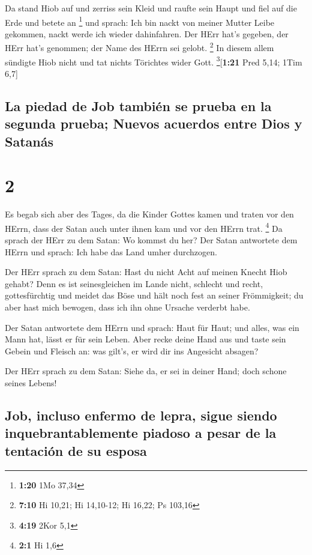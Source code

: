  Da stand Hiob auf und zerriss sein Kleid und raufte sein
Haupt und fiel auf die Erde und betete an \footnote{\textbf{1:20} 1Mo
  37,34}  und sprach: Ich bin nackt von meiner Mutter
Leibe gekommen, nackt werde ich wieder dahinfahren. Der HErr hat's
gegeben, der HErr hat's genommen; der Name des HErrn sei gelobt.
\footnote{\textbf{7:10} Hi 10,21; Hi 14,10-12; Hi 16,22; Ps 103,16}
 In diesem allem sündigte Hiob nicht und tat nichts
Törichtes wider Gott. \footnote{\textbf{4:19} 2Kor 5,1}{[}\textbf{1:21}
Pred 5,14; 1Tim 6,7{]}

\hypertarget{la-piedad-de-job-tambiuxe9n-se-prueba-en-la-segunda-prueba-nuevos-acuerdos-entre-dios-y-satanuxe1s}{%
\subsection{La piedad de Job también se prueba en la segunda prueba;
Nuevos acuerdos entre Dios y
Satanás}\label{la-piedad-de-job-tambiuxe9n-se-prueba-en-la-segunda-prueba-nuevos-acuerdos-entre-dios-y-satanuxe1s}}

\hypertarget{section-1}{%
\section{2}\label{section-1}}

 Es begab sich aber des Tages, da die Kinder Gottes kamen
und traten vor den HErrn, dass der Satan auch unter ihnen kam und vor
den HErrn trat. \footnote{\textbf{2:1} Hi 1,6}  Da sprach
der HErr zu dem Satan: Wo kommst du her? Der Satan antwortete dem HErrn
und sprach: Ich habe das Land umher durchzogen.

 Der HErr sprach zu dem Satan: Hast du nicht Acht auf
meinen Knecht Hiob gehabt? Denn es ist seinesgleichen im Lande nicht,
schlecht und recht, gottesfürchtig und meidet das Böse und hält noch
fest an seiner Frömmigkeit; du aber hast mich bewogen, dass ich ihn ohne
Ursache verderbt habe.

 Der Satan antwortete dem HErrn und sprach: Haut für Haut;
und alles, was ein Mann hat, lässt er für sein Leben. 
Aber recke deine Hand aus und taste sein Gebein und Fleisch an: was
gilt's, er wird dir ins Angesicht absagen?

 Der HErr sprach zu dem Satan: Siehe da, er sei in deiner
Hand; doch schone seines Lebens!

\hypertarget{job-incluso-enfermo-de-lepra-sigue-siendo-inquebrantablemente-piadoso-a-pesar-de-la-tentaciuxf3n-de-su-esposa}{%
\subsection{Job, incluso enfermo de lepra, sigue siendo
inquebrantablemente piadoso a pesar de la tentación de su
esposa}\label{job-incluso-enfermo-de-lepra-sigue-siendo-inquebrantablemente-piadoso-a-pesar-de-la-tentaciuxf3n-de-su-esposa}}

